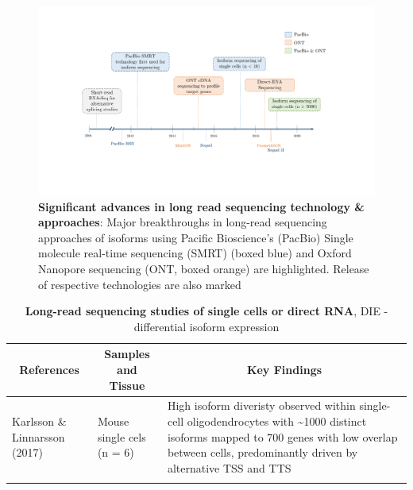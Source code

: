 


\begin{changemargin}{1.5cm}
	\begin{landscape}
		\begin{figure}[]
			\includegraphics[page=1,trim={0 4cm 1.8cm 2cm},clip, scale = 0.8]{Figures/Introduction_Figures_Landscape.pdf}
			\caption[Timeline of long read sequencing technology \& approaches]%
			{\textbf{Significant advances in long read sequencing technology \& approaches}: Major breakthroughs in long-read sequencing approaches of isoforms using Pacific Bioscience's (PacBio) Single molecule real-time sequencing (SMRT) (boxed blue) and Oxford Nanopore sequencing (ONT, boxed orange) are highlighted. Release of respective technologies are also marked }
			\label{fig:longread_timeline}
		\end{figure}
	\end{landscape}
	
	
	\begin{landscape}
		\small %
		\setlength\tabcolsep{2pt} %
		\renewcommand{\arraystretch}{1}
		\begin{longtable}[c]{p{4cm}p{4cm}p{18cm}}
			\caption[Long-read sequencing studies of single cells or direct RNA]%
			{\textbf{Long-read sequencing studies of single cells or direct RNA}, DIE - differential isoform expression}
			\label{tab: longread_advancedstudies}\\
			
			\toprule
			\multicolumn{1}{c}{References} &
			\multicolumn{1}{c}{Samples and Tissue} &
			\multicolumn{1}{c}{Key Findings} \\* \midrule
			\endfirsthead
			\endhead
			\bottomrule
			\endfoot
			\endlastfoot
			\centering Karlsson \& Linnarsson (2017)\cite{Karlsson2017} &
			\centering Mouse single cels (n = 6)  &
			\tabitem High isoform diveristy observed within single-cell oligodendrocytes with \textasciitilde1000 distinct isoforms mapped to 700 genes with low overlap between cells, predominantly driven by alternative TSS and TTS \\
			\hdashline[0.5pt/5pt]	
			

\end{longtable}
\end{landscape}
\end{changemargin}
